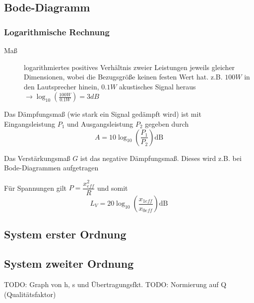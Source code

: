 \subsection{Bode-Diagramm}
\subsubsection{Logarithmische Rechnung}
\begin{description}
    \item[Maß] logarithmiertes positives Verhältnis zweier Leistungen jeweils gleicher Dimensionen, wobei die Bezugsgröße keinen festen Wert hat.
          z.B. $100W$ in den Lautsprecher hinein, $0.1W$ akustisches Signal heraus $\rightarrow \log_{10}(\frac{100W}{0.1W})=3dB$
\end{description}

\begin{sectionbox}
    \begin{emphbox}
        Das Dämpfungsmaß (wie stark ein Signal gedämpft wird) ist mit Eingangsleistung $P_1$ und Ausgangsleistung $P_2$ gegeben durch
        \begin{equation*}
            A=10\log_{10}\left(\frac{P_1}{P_2}\right)\text{dB}
        \end{equation*}

        Das Verstärkungsmaß $G$ ist das negative Dämpfungsmaß. Dieses wird z.B. bei Bode-Diagrammen aufgetragen
    \end{emphbox}

    Für Spannungen gilt $P=\dfrac{x_{eff}^2}{R}$ und somit \begin{equation*}
        L_V=20\log_{10}\left(\frac{x_{1eff}}{x_{0eff}}\right) \text{dB}
    \end{equation*}
\end{sectionbox}

\subsection{System erster Ordnung}
\subsection{System zweiter Ordnung}
TODO: Graph von h, s und Übertragungsfkt.
TODO: Normierung auf Q (Qualitätsfaktor)
